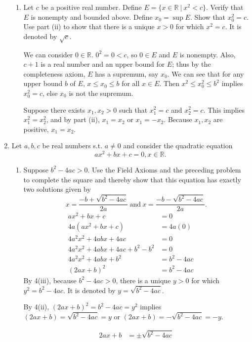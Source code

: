 \documentclass[a4paper,10pt]{book}
\theoremstyle{plain} %
\begin{document}
\begin{enumerate}
\begin{enumerate}[label=(\roman*),align=left]
        \item Let $c$ be a positive real number. Define $E = \{ x \in \mathbb{R} \ |\  x^2 < c\}$. Verify that $E$ is nonempty and bounded above.
		Define $x_0 = \sup E$. Show that $x_0^2 = c$. Use part (ii) to show that there is a unique $x>0$ for which $x^2=c$. It is denoted by $\sqrt{c}$.\par
		We can consider $0\in \mathbb{R}$. $0^2=0<c$, so $0\in E$ and $E$ is nonempty. Also, $c+1$ is a real number and an upper bound for $E$; thus by the completeness axiom, $E$ has a supremum, say $x_0$.
		We can see that for any upper bound $b$ of $E$, $x \le x_0 \le b$ for all $x \in E$. Then $x^2 \le x_0^2 \le b^2$ implies $x_0^2=c$, else $x_0$ is not the supremum. \par
		Suppose there exists $x_1,x_2 > 0$ such that $x_1^2 = c$ and $x_2^2 = c$. This implies $x_1^2 = x_2^2$, and by part (ii), $x_1 = x_2$ or $x_1 = -x_2$. Because $x_1,x_2$ are positive, $x_1 = x_2$.
    \end{enumerate}
	\item Let $a,b,c$ be real numbers s.t. $a\neq 0$ and consider the quadratic equation \[ ax^2+bx+c=0, x \in \mathbb{R}.\]
	\begin{enumerate}[label=(\roman*),align=left]
        \item Suppose $b^2 - 4ac >0$. Use the Field Axioms and the preceding problem to complete the square and thereby show that this equation has exactly two solutions given by
		\[  x = \dfrac{-b + \sqrt{b^2-4ac}}{2a} \ \text{and}\  x = \dfrac{-b - \sqrt{b^2-4ac}}{2a}. \]
		\begin{align*}
			ax^2+bx+c & = 0 \\
			4a(ax^2+bx+c) & = 4a(0) \\
			4a^2x^2+4abx+4ac & = 0 && \tag*{by distributive property}\\
			4a^2x^2+4abx+4ac+b^2-b^2 & = 0 && \tag*{by additive inverse}\\
			4a^2x^2+4abx+b^2 & = b^2-4ac \\
			(2ax+b)^2 & = b^2-4ac 
		\end{align*}
		By 4(iii), because $b^2 - 4ac >0$, there is a unique $y>0$ for which $y^2 = b^2-4ac$. It is denoted by $y = \sqrt{b^2-4ac}$.\par
		By 4(ii), $(2ax+b)^2 = b^2-4ac = y^2$ implies $(2ax+b) = \sqrt{b^2-4ac} = y$ or $(2ax+b) = -\sqrt{b^2-4ac} = -y.$\par
		\begin{align*}
			2ax+b & = \pm \sqrt{b^2-4ac} \\

\end{align*}
\end{enumerate}
\end{enumerate}
\end{document}
